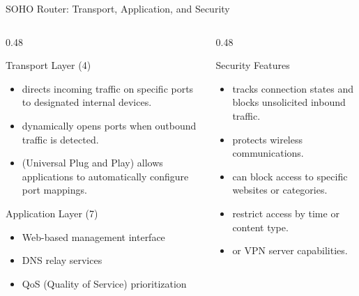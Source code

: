 \documentclass[aspectratio=169]{beamer}  %
\begin{document}
\begin{frame}{SOHO Router: Transport, Application, and Security}
    \begin{columns}[T]
        \begin{column}{0.48\textwidth}
            \begin{block}{Transport Layer (4)}
                \begin{itemize}
                    \small
                    \item {} directs incoming traffic on specific ports to designated internal devices.
                    \item {} dynamically opens ports when outbound traffic is detected.
                    \item {} (Universal Plug and Play) allows applications to automatically configure port mappings.
                \end{itemize}
            \end{block}
            
            \vspace{0.3em}
            \begin{block}{Application Layer (7)}
                \begin{itemize}
                    \small
                    \item Web-based management interface
                    \item DNS relay services
                    \item QoS (Quality of Service) prioritization
                \end{itemize}
            \end{block}
        \end{column}
        \begin{column}{0.48\textwidth}
            \begin{alertblock}{Security Features}
                \begin{itemize}
                    \small
                    \item {} tracks connection states and blocks unsolicited inbound traffic.
                    \item {} protects wireless communications.
                    \item {} can block access to specific websites or categories.
                    \item {} restrict access by time or content type.
                    \item {} or VPN server capabilities.
                \end{itemize}
            \end{alertblock}
        \end{column}
    \end{columns}
\end{frame}
\end{document}
